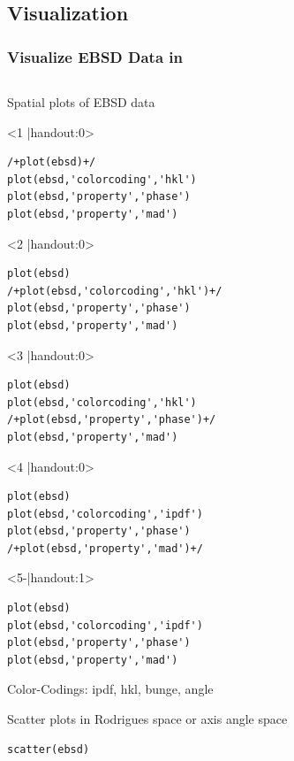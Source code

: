 \subsection*{Visualization}

\begin{frame}[fragile]
  \frametitle{Visualize EBSD Data in \MTEX}

  \begin{columns}
    \begin{column}{8.5cm}

Spatial plots of EBSD data
\begin{onlyenv}<1 |handout:0>
\begin{lstlisting}
/+plot(ebsd)+/
plot(ebsd,'colorcoding','hkl')
plot(ebsd,'property','phase')
plot(ebsd,'property','mad')
\end{lstlisting}
\end{onlyenv}
%
\begin{onlyenv}<2 |handout:0>
\begin{lstlisting}
plot(ebsd)
/+plot(ebsd,'colorcoding','hkl')+/
plot(ebsd,'property','phase')
plot(ebsd,'property','mad')
\end{lstlisting}
\end{onlyenv}
%
\begin{onlyenv}<3 |handout:0>
\begin{lstlisting}
plot(ebsd)
plot(ebsd,'colorcoding','hkl')
/+plot(ebsd,'property','phase')+/
plot(ebsd,'property','mad')
\end{lstlisting}
\end{onlyenv}
%
\begin{onlyenv}<4 |handout:0>
\begin{lstlisting}
plot(ebsd)
plot(ebsd,'colorcoding','ipdf')
plot(ebsd,'property','phase')
/+plot(ebsd,'property','mad')+/
\end{lstlisting}
\end{onlyenv}
%
\begin{onlyenv}<5-|handout:1>
\begin{lstlisting}
plot(ebsd)
plot(ebsd,'colorcoding','ipdf')
plot(ebsd,'property','phase')
plot(ebsd,'property','mad')
\end{lstlisting}
\end{onlyenv}

Color-Codings: ipdf, hkl, bunge, angle

\medskip

\pause
\pause
\pause
\pause

Scatter plots in Rodrigues space or axis angle space
\begin{lstlisting}
scatter(ebsd)
\end{lstlisting}


\end{column}
\end{columns}
\end{frame}
